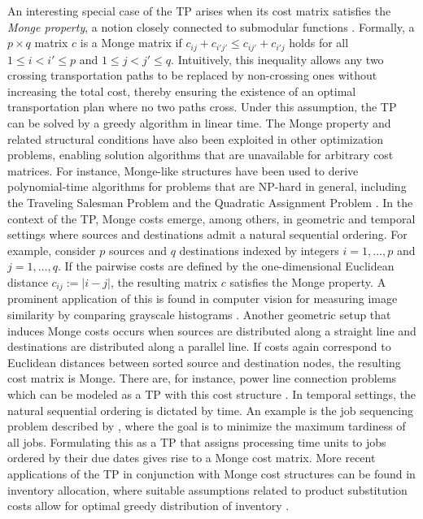\documentclass[letterpaper]{article}
\begin{document}
An interesting special case of the TP arises when its cost matrix satisfies the \textit{Monge property}, a notion closely connected to submodular functions \citep[see][]{queyranne_general_1998}. Formally, a $p \times q$ matrix $c$ is a Monge matrix if $c_{ij} + c_{i'j'} \leq c_{ij'} + c_{i'j}$ holds for all $1 \leq i < i' \leq p$ and $1 \leq j < j' \leq q$. Intuitively, this inequality allows any two crossing transportation paths to be replaced by non-crossing ones without increasing the total cost, thereby ensuring the existence of an optimal transportation plan where no two paths cross. Under this assumption, the TP can be solved by a greedy algorithm in linear time. The Monge property and related structural conditions have also been exploited in other optimization problems, enabling solution algorithms that are unavailable for arbitrary cost matrices. For instance, Monge-like structures have been used to derive polynomial-time algorithms for problems that are NP-hard in general, including the Traveling Salesman Problem and the Quadratic Assignment Problem \citep[see][]{BurkardKlinzRudolf1996, CELA2018}. In the context of the TP, Monge costs emerge, among others, in geometric and temporal settings where sources and destinations admit a natural sequential ordering. For example, consider $p$ sources and $q$ destinations indexed by integers $i = 1, \dots, p$ and $j = 1, \dots, q$. If the pairwise costs are defined by the one-dimensional Euclidean distance $c_{ij} := |i-j|$, the resulting matrix $c$ satisfies the Monge property. A prominent application of this is found in computer vision for measuring image similarity by comparing grayscale histograms \citep{WERMAN1985, RUBNER1998}. Another geometric setup that induces Monge costs occurs when sources are distributed along a straight line and destinations are distributed along a parallel line. If costs again correspond to Euclidean distances between sorted source and destination nodes, the resulting cost matrix is Monge. There are, for instance, power line connection problems which can be modeled as a TP with this cost structure \citep{AGGARWAL1995}. In temporal settings, the natural sequential ordering is dictated by time. An example is the job sequencing problem described by \citet{Hoffman1963SimpleLP}, where the goal is to minimize the maximum tardiness of all jobs. Formulating this as a TP that assigns processing time units to jobs ordered by their due dates gives rise to a Monge cost matrix. More recent applications of the TP in conjunction with Monge cost structures can be found in inventory allocation, where suitable assumptions related to product substitution costs allow for optimal greedy distribution of inventory \citep{TSEYTLIN2019, TSEYTLIN2023}.
\end{document}
